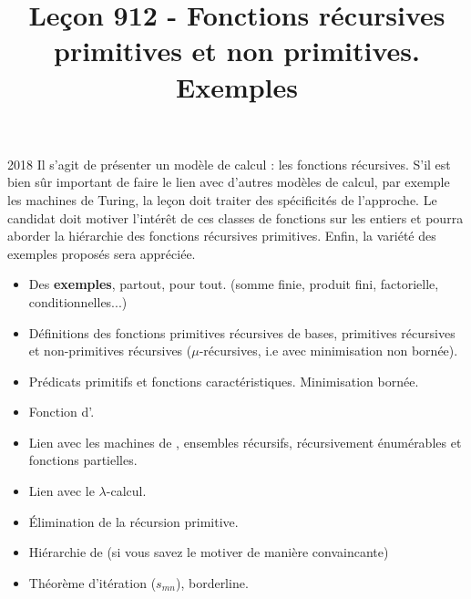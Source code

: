 \documentclass{agregfiche}
\title{Leçon 912 - Fonctions récursives primitives et non primitives. Exemples}
\begin{document}
\maketitle

\secrapports
\begin{rapport}{2018}
	Il s’agit de présenter un modèle de calcul : les fonctions récursives. S’il est bien sûr important de faire
	le lien avec d’autres modèles de calcul, par exemple les machines de Turing, la leçon doit traiter des
	spécificités de l’approche. Le candidat doit motiver l’intérêt de ces classes de fonctions sur les entiers et
	pourra aborder la hiérarchie des fonctions récursives primitives. Enfin, la variété des exemples proposés
	sera appréciée.
\end{rapport}

\secindispensables

\begin{itemize}
	\item Des \textbf{exemples}, partout, pour tout. (somme finie, produit fini, factorielle, conditionnelles...)
	\item Définitions des fonctions primitives récursives de bases, primitives récursives et non-primitives récursives ($\mu$-récursives, i.e avec minimisation non bornée).
	\item Prédicats primitifs et fonctions caractéristiques. Minimisation bornée.

\end{itemize}

\secasavoir

\begin{itemize}
	\item Fonction d'.
	\item Lien avec les machines de , ensembles récursifs, récursivement énumérables et fonctions partielles.
\end{itemize}


\secidees

\begin{itemize}
       \item Lien avec le $\lambda$-calcul.
       \item Élimination de la récursion primitive.
       \item Hiérarchie de  (si vous savez le motiver de manière convaincante)
       \item Théorème d'itération ($s_{mn}$), borderline.
\end{itemize}
\end{document}

